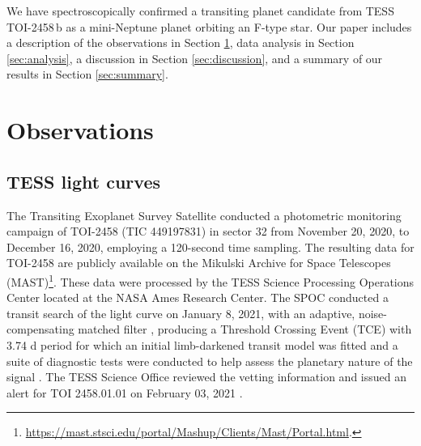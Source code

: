 \documentclass[traditabstract,longauth]{aa}
\begin{document}

We have spectroscopically confirmed a transiting planet candidate from TESS TOI-2458\,b as a mini-Neptune planet orbiting an F-type star. Our paper includes a description of the observations in Section \ref{sec:observations}, data analysis in Section \ref{sec:analysis}, a discussion in Section \ref{sec:discussion}, and a summary of our results in Section \ref{sec:summary}.



%
%

\section{Observations}\label{sec:observations}

\subsection{TESS light curves}\label{sec:TESS}

The Transiting Exoplanet Survey Satellite \citep[TESS;][]{Ricker15} conducted a photometric monitoring campaign of TOI-2458 (TIC 449197831) in sector 32 from November 20, 2020, to December 16, 2020, employing a 120-second time sampling. The resulting data for TOI-2458 are publicly available on the Mikulski Archive for Space Telescopes (MAST)\footnote{\url{https://mast.stsci.edu/portal/Mashup/Clients/Mast/Portal.html}.}. These data were processed by the TESS Science Processing Operations Center \citep[SPOC;][]{Jenkins16} located at the NASA Ames Research Center. The SPOC conducted a transit search of the light curve on January 8, 2021, with an adaptive, noise-compensating matched filter \citep{Jenkins02,Jenkins10,Jenkins20}, producing a Threshold Crossing Event (TCE) with 3.74 d period for which an initial limb-darkened transit model was fitted \citep{Li19} and a suite of diagnostic tests were conducted to help assess the planetary nature of the signal \citep{Twicken18}. The TESS Science Office reviewed the vetting information and issued an alert for TOI 2458.01.01 on February 03, 2021 \citep{Guerrero21}.
\end{document}
